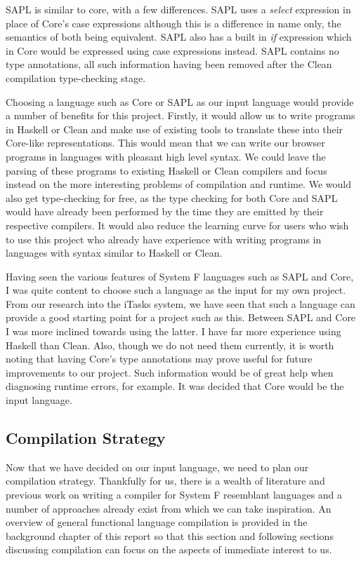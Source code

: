 SAPL is similar to core, with a few differences. SAPL uses a \emph{select} 
expression in place of Core's case expressions although this is a difference in name
only, the semantics of both being equivalent. SAPL also has a built in \emph{if}
expression which in Core would be expressed using case expressions instead. SAPL
contains no type annotations, all such information having been removed after the
Clean compilation type-checking stage.

Choosing a language such as Core or SAPL as our input language would provide
a number of benefits for this project. Firstly, it would allow us to write
programs in Haskell or Clean and make use of existing tools to translate these
into their Core-like representations. This would mean that we can write our browser
programs in languages with pleasant high level syntax. We could leave the 
parsing of these programs to existing Haskell or Clean compilers and focus 
instead on the more interesting problems of compilation and runtime. We would
also get type-checking for free, as the type checking for both Core and SAPL 
would have already been performed by the time they are emitted by their respective
compilers. It would also reduce the learning curve for users who wish to use
this project who already have experience with writing programs in languages
with syntax similar to Haskell or Clean.
 
Having seen the various features of System F languages such as SAPL and Core, I
was quite content to choose such a language as the input for my own project. 
From our research into the iTasks system, we have seen that such a language 
can provide a good starting point for a project such as this. Between SAPL and
Core I was more inclined towards using the latter. I have far more experience
using Haskell than Clean. Also, though we do not need them currently, it is
worth noting that having Core's type annotations may prove useful for future
improvements to our project. Such information would be of great help when 
diagnosing runtime errors, for example. It was decided that Core would be the
input language.

\subsection{Compilation Strategy}
Now that we have decided on our input language, we need to plan our compilation
strategy. Thankfully for us, there is a wealth of literature and previous work
on writing a compiler for System F resemblant languages and a number of approaches
already exist from which we can take inspiration. An overview of general 
functional language compilation is provided in the background chapter of this
report so that this section and following sections discussing compilation can 
focus on the aspects of immediate interest to us.

